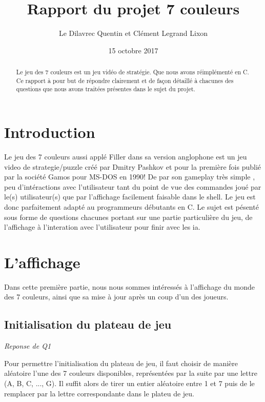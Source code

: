 \documentclass[a4paper,11pt]{article}
\begin{document}
\title{Rapport du projet 7 couleurs}

\author{Le Dilavrec Quentin et Clément Legrand Lixon}

\date{15 octobre 2017}

\maketitle

\begin{abstract}
Le jeu des 7 couleurs est un jeu vidéo de stratégie.
Que nous avons réimplémenté en C. Ce rapport à pour but de répondre 
clairement et de façon détaillé à chacunes des questions  que nous avons
traitées présentes dans le sujet du projet.
\end{abstract}


\section{Introduction}
Le jeu des 7 couleurs aussi applé Filler dans sa version anglophone est 
un jeu video de strategie/puzzle créé par Dmitry Pashkov et pour la première 
fois publié par la société Gamos pour MS-DOS en 1990! De par son gameplay 
très simple , peu d'intéractions avec l'utilisateur tant du point de vue des commandes 
joué par le(s) utilisateur(s) que par l'affichage facilement faisable dans le shell. 
Le jeu est donc parfaitement adapté au programmeurs débutants en C. Le sujet est 
pésenté sous forme de questions chacunes portant sur une partie particulière du jeu, 
de l'affichage à l'interation avec l'utilisateur pour finir avec les ia.


\section{L'affichage}

Dans cette première partie, nous nous sommes intéressés à l'affichage
du monde des 7 couleurs, ainsi que sa mise à jour après un coup d'un des
joueurs.

\subsection{Initialisation du plateau de jeu}
\emph{Reponse de Q1}

Pour permettre l'initialisation du plateau de jeu, il faut choisir de manière aléatoire l'une des 7 couleurs disponibles, représentées par la suite par une lettre (A, B, C, ..., G). Il suffit alors de tirer un entier aléatoire entre 1 et 7 puis de le remplacer par la lettre correspondante dans le plateu de jeu. 
\end{document}
